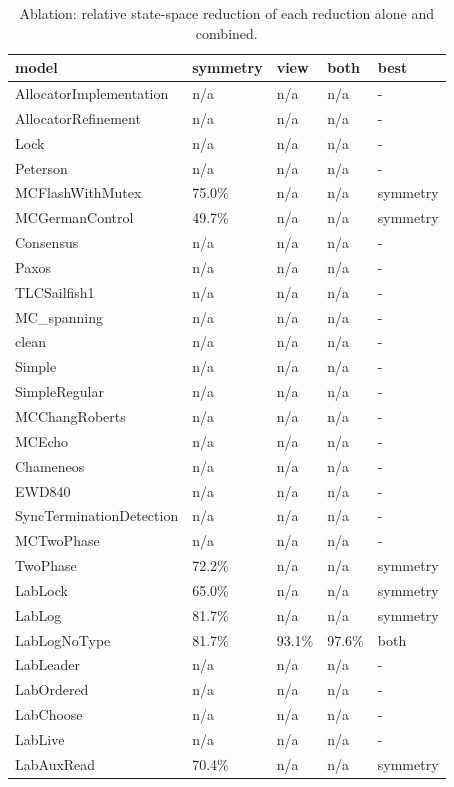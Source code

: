 \begin{table}[t]
\centering
\caption{Ablation: relative state-space reduction of each reduction alone and combined.}
\label{tab:rq4}
\small
\begin{tabular}{lllll}
\toprule
model & symmetry & view & both & best \\
\midrule
AllocatorImplementation & n/a & n/a & n/a & - \\
AllocatorRefinement & n/a & n/a & n/a & - \\
Lock & n/a & n/a & n/a & - \\
Peterson & n/a & n/a & n/a & - \\
MCFlashWithMutex & 75.0\% & n/a & n/a & symmetry \\
MCGermanControl & 49.7\% & n/a & n/a & symmetry \\
Consensus & n/a & n/a & n/a & - \\
Paxos & n/a & n/a & n/a & - \\
TLCSailfish1 & n/a & n/a & n/a & - \\
MC\_spanning & n/a & n/a & n/a & - \\
clean & n/a & n/a & n/a & - \\
Simple & n/a & n/a & n/a & - \\
SimpleRegular & n/a & n/a & n/a & - \\
MCChangRoberts & n/a & n/a & n/a & - \\
MCEcho & n/a & n/a & n/a & - \\
Chameneos & n/a & n/a & n/a & - \\
EWD840 & n/a & n/a & n/a & - \\
SyncTerminationDetection & n/a & n/a & n/a & - \\
MCTwoPhase & n/a & n/a & n/a & - \\
TwoPhase & 72.2\% & n/a & n/a & symmetry \\
LabLock & 65.0\% & n/a & n/a & symmetry \\
LabLog & 81.7\% & n/a & n/a & symmetry \\
LabLogNoType & 81.7\% & 93.1\% & 97.6\% & both \\
LabLeader & n/a & n/a & n/a & - \\
LabOrdered & n/a & n/a & n/a & - \\
LabChoose & n/a & n/a & n/a & - \\
LabLive & n/a & n/a & n/a & - \\
LabAuxRead & 70.4\% & n/a & n/a & symmetry \\
\bottomrule
\end{tabular}
\end{table}
